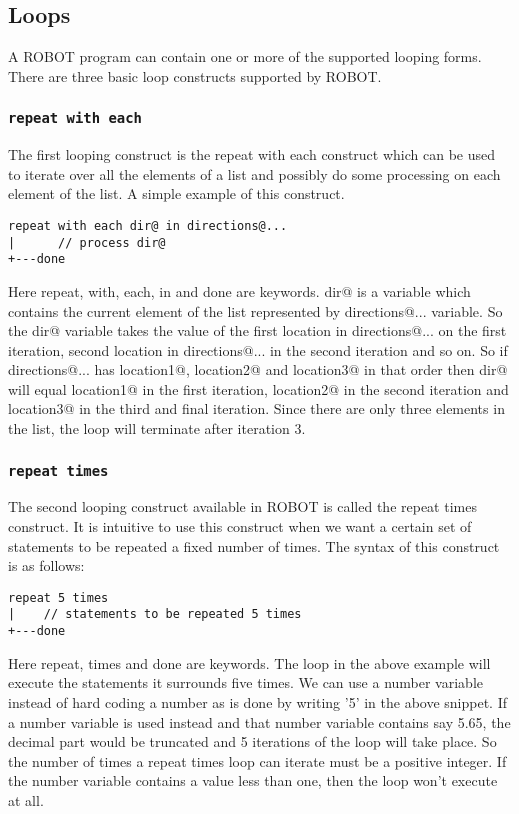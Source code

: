 \documentclass[a4paper]{article}
\begin{document}
\subsection{Loops}

A ROBOT program can contain one or more of the supported looping forms. There are three basic loop constructs supported by ROBOT.

\subsubsection{\texttt{repeat with each}}

The first looping construct is the repeat with each construct which can be used to iterate over all the elements of a list and possibly do some processing on each element of the list. A simple example of this construct.

\begin{verbatim}
repeat with each dir@ in directions@...  
|      // process dir@
+---done
\end{verbatim}

Here repeat, with, each, in and done are keywords. dir@ is a variable which contains the current element of the list represented by directions@... variable. So the dir@ variable takes the value of the first location in directions@... on the first iteration, second location in directions@... in the second iteration and so on. So if directions@... has location1@, location2@ and location3@ in that order then dir@ will equal location1@ in the first iteration, location2@ in the second iteration and location3@ in the third and final iteration. Since there are only three elements in the list, the loop will terminate after iteration 3.

\subsubsection{\texttt{repeat times}}

The second looping construct available in ROBOT is called the repeat times construct. It is intuitive to use this construct when we want a certain set of statements to be repeated a fixed number of times. The syntax of this construct is as follows:

\begin{verbatim}
repeat 5 times
|    // statements to be repeated 5 times
+---done
\end{verbatim}

Here repeat, times and done are keywords. The loop in the above example will execute the statements it surrounds five times. We can use a number variable instead of hard coding a number as is done by writing '5' in the above snippet. If a number variable is used instead and that number variable contains say 5.65, the decimal part would be truncated and 5 iterations of the loop will take place. So the number of times a repeat times loop can iterate must be a positive integer. If the number variable contains a value less than one, then the loop won't execute at all.
\end{document}
